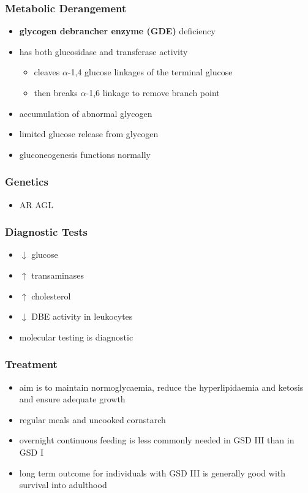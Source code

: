 \documentclass[12pt]{scrartcl}
\begin{document}
\subsubsection{Metabolic Derangement}
\label{sec:org65dd80c}
\begin{itemize}
\item \textbf{glycogen debrancher enzyme (GDE)} deficiency
\item has both glucosidase and transferase activity
\begin{itemize}
\item cleaves \(\alpha\)-1,4 glucose linkages of the terminal glucose
\item then breaks \(\alpha\)-1,6 linkage to remove branch point
\end{itemize}
\item accumulation of abnormal glycogen
\item limited glucose release from glycogen
\item gluconeogenesis functions normally
\end{itemize}
\subsubsection{Genetics}
\label{sec:orgb23f367}
\begin{itemize}
\item AR AGL
\end{itemize}
\subsubsection{Diagnostic Tests}
\label{sec:org604f96b}
\begin{itemize}
\item \(\downarrow\) glucose
\item \(\uparrow\) transaminases
\item \(\uparrow\) cholesterol
\item \(\downarrow\) DBE activity in leukocytes
\item molecular testing is diagnostic
\end{itemize}
\subsubsection{Treatment}
\label{sec:org4780bc8}
\begin{itemize}
\item aim is to maintain normoglycaemia, reduce the hyperlipidaemia and ketosis and
ensure adequate growth
\item regular meals and uncooked cornstarch
\item overnight continuous feeding is less commonly needed in GSD III than
in GSD I
\item long term outcome for individuals with GSD III is generally good
with survival into adulthood
\end{itemize}
\end{document}
